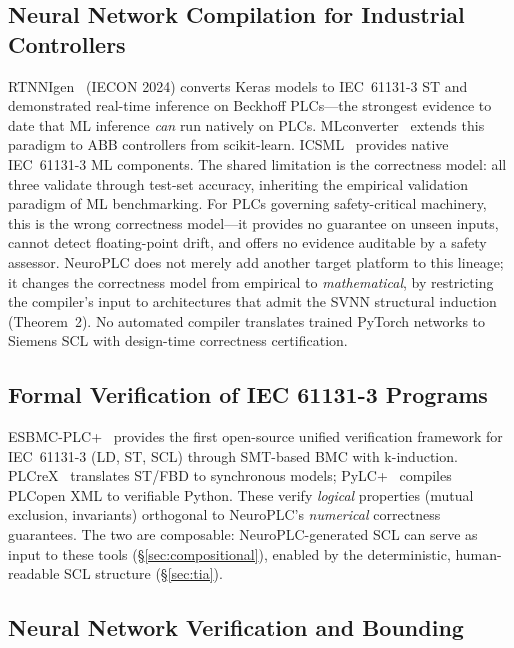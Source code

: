 \documentclass[journal,onecolumn]{IEEEtran}
\newcommand{\neuroplc}{NeuroPLC\xspace}
\begin{document}
\subsection{Neural Network Compilation for Industrial Controllers}

RTNNIgen~\cite{rtnnigen2024} (IECON 2024) converts Keras models to
IEC~61131-3 ST and demonstrated real-time inference on Beckhoff PLCs---the
strongest evidence to date that ML inference \textit{can} run natively on
PLCs. MLconverter~\cite{mlconverter2025} extends this paradigm to ABB
controllers from scikit-learn. ICSML~\cite{icsml2023} provides native
IEC~61131-3 ML components. The shared limitation is the correctness model:
all three validate through test-set accuracy, inheriting the empirical
validation paradigm of ML benchmarking. For PLCs governing safety-critical
machinery, this is the wrong correctness model---it provides no guarantee on
unseen inputs, cannot detect floating-point drift, and offers no evidence
auditable by a safety assessor. \neuroplc does not merely add another target
platform to this lineage; it changes the correctness model from empirical to
\textit{mathematical}, by restricting the compiler's input to architectures
that admit the SVNN structural induction (Theorem~2). No automated compiler
translates trained PyTorch networks to Siemens SCL with design-time
correctness certification.

\subsection{Formal Verification of IEC 61131-3 Programs}
\label{sec:plc-verification}

ESBMC-PLC+~\cite{esbmc_plc_plus_2026} provides the first open-source unified
verification framework for IEC~61131-3 (LD, ST, SCL) through SMT-based BMC
with k-induction. PLCreX~\cite{werner2025plcrex} translates ST/FBD to
synchronous models; PyLC+~\cite{ebrahimi2025pylc} compiles PLCopen XML to
verifiable Python. These verify \textit{logical} properties (mutual exclusion,
invariants) orthogonal to \neuroplc's \textit{numerical} correctness guarantees.
The two are composable: \neuroplc-generated SCL can serve as input to these
tools ({\S}\ref{sec:compositional}), enabled by the deterministic, human-readable
SCL structure ({\S}\ref{sec:tia}).

\subsection{Neural Network Verification and Bounding}
\label{sec:nn-verification}
\end{document}
